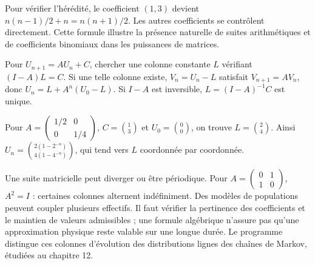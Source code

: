 Pour vérifier l'hérédité, le coefficient $(1,3)$ devient $n(n-1)/2+n=n(n+1)/2$. Les autres coefficients se contrôlent directement.
Cette formule illustre la présence naturelle de suites arithmétiques et de coefficients binomiaux dans les puissances de matrices.
\begin{savoirfaire}
Pour $U_{n+1}=AU_n+C$, chercher une colonne constante $L$ vérifiant $(I-A)L=C$.
Si une telle colonne existe, $V_n=U_n-L$ satisfait $V_{n+1}=AV_n$, donc
$U_n=L+A^n(U_0-L)$.
Si $I-A$ est inversible, $L=(I-A)^{-1}C$ est unique.
\end{savoirfaire}
\begin{exemple}
Pour $A=\begin{pmatrix}1/2&0\\0&1/4\end{pmatrix}$, $C=\binom13$ et $U_0=\binom00$, on trouve $L=\binom24$.
Ainsi $U_n=\binom{2(1-2^{-n})}{4(1-4^{-n})}$, qui tend vers $L$ coordonnée par coordonnée.
\end{exemple}
Une suite matricielle peut diverger ou être périodique. Pour $A=\begin{pmatrix}0&1\\1&0\end{pmatrix}$, $A^2=I$ : certaines colonnes alternent indéfiniment.
Des modèles de populations peuvent coupler plusieurs effectifs. Il faut vérifier la pertinence des coefficients et le maintien de valeurs admissibles ; une formule algébrique n'assure pas qu'une approximation physique reste valable sur une longue durée.
Le programme distingue ces colonnes d'évolution des distributions lignes des chaînes de Markov, étudiées au chapitre 12.


